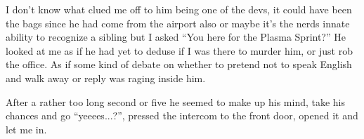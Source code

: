 I don’t know what clued me off to him being one of the devs, it could have been the bags since he had come from the airport also or maybe it's the nerds innate ability to recognize a sibling but I asked “You here for the Plasma Sprint?” 
He looked at me as if he had yet to deduse if I was there to murder him, or just rob the office. As if some kind of debate on whether to pretend not to speak English and walk away or reply was raging inside him. 

After a rather too long second or five he seemed to make up his mind, take his chances and go “yeeees...?”, pressed the intercom to the front door, opened it and let me in.
